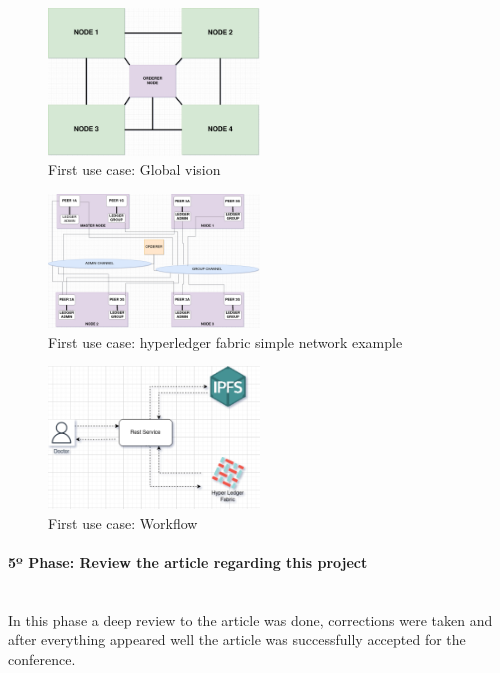 \begin{figure}[H]
    \centering
    \includegraphics[width=0.5\textwidth]{assets/use-case-1/global-vision.drawio.png} %
    \caption{First use case: Global vision}
    \label{fig:sample-image} 
\end{figure}

\begin{figure}[H]
    \centering
    \includegraphics[width=0.5\textwidth]{assets/use-case-1/hyper-ledger-view.drawio.png} %
    \caption{First use case: hyperledger fabric simple network example}
    \label{fig:sample-image} 
\end{figure}

\begin{figure}[H]
    \centering
    \includegraphics[width=0.5\textwidth]{assets/use-case-1/workflow.png} %
    \caption{First use case: Workflow}
    \label{fig:sample-image} 
\end{figure}


\paragraph{5º Phase: Review the article regarding this project}\mbox{}\\
In this phase a deep review to the article was done, corrections were taken and after everything appeared well the article was successfully accepted for the conference.

